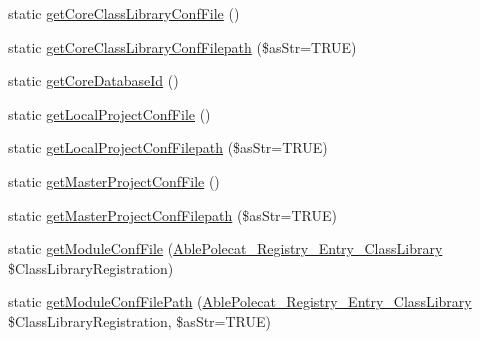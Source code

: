 \begin{DoxyCompactItemize}
\item 
static \hyperlink{class_able_polecat___mode___config_aacf69cc3cf05703578df104da8eb0bcd}{get\+Core\+Class\+Library\+Conf\+File} ()
\item 
static \hyperlink{class_able_polecat___mode___config_aa5af30def44e95a5430e8dfeb3a9ad58}{get\+Core\+Class\+Library\+Conf\+Filepath} (\$as\+Str=T\+R\+U\+E)
\item 
static \hyperlink{class_able_polecat___mode___config_a2c846f82f5a9eaf53b91c3044368f90a}{get\+Core\+Database\+Id} ()
\item 
static \hyperlink{class_able_polecat___mode___config_a7ca948548573f53759da0cffe9d091ad}{get\+Local\+Project\+Conf\+File} ()
\item 
static \hyperlink{class_able_polecat___mode___config_a893cd31087f31a29352a8bd2d5c05433}{get\+Local\+Project\+Conf\+Filepath} (\$as\+Str=T\+R\+U\+E)
\item 
static \hyperlink{class_able_polecat___mode___config_a115ac4346504ae0611ae1a31b3c04aa9}{get\+Master\+Project\+Conf\+File} ()
\item 
static \hyperlink{class_able_polecat___mode___config_a37318e85fb6ad1deaa8e946b4fd600f9}{get\+Master\+Project\+Conf\+Filepath} (\$as\+Str=T\+R\+U\+E)
\item 
static \hyperlink{class_able_polecat___mode___config_a7feaf8557552f12d5e32eb4cf59cee56}{get\+Module\+Conf\+File} (\hyperlink{class_able_polecat___registry___entry___class_library}{Able\+Polecat\+\_\+\+Registry\+\_\+\+Entry\+\_\+\+Class\+Library} \$Class\+Library\+Registration)
\item 
static \hyperlink{class_able_polecat___mode___config_a1f15f64da7e2d81379ced14727f5f52a}{get\+Module\+Conf\+File\+Path} (\hyperlink{class_able_polecat___registry___entry___class_library}{Able\+Polecat\+\_\+\+Registry\+\_\+\+Entry\+\_\+\+Class\+Library} \$Class\+Library\+Registration, \$as\+Str=T\+R\+U\+E)
\end{DoxyCompactItemize}
